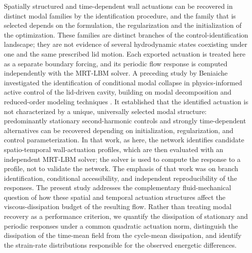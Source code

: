 \documentclass[11pt,a4paper]{article}
\begin{document}
Spatially structured and time-dependent wall actuations can be recovered in
distinct modal families by the identification procedure, and the family that is
selected depends on the formulation, the regularization and the initialization of
the optimization. These families are distinct branches of the
control-identification landscape; they are not evidence of several hydrodynamic
states coexisting under one and the same prescribed lid motion. Each exported
actuation is treated here as a separate boundary forcing, and its
periodic flow response is computed independently with the MRT-LBM solver. A
preceding study by Beniaiche \cite{beniaiche2026} investigated the identification
of conditional modal collapse in
physics-informed active control of the lid-driven cavity, building on modal
decomposition and reduced-order modeling techniques
\cite{schmid2010dmd,taira2017modal,sipp2010global,noack2003hierarchy}. It established that the
identified actuation is not characterized by a unique, universally selected modal
structure: predominantly stationary second-harmonic controls and strongly
time-dependent alternatives can be recovered depending on initialization,
regularization, and control parameterization. In that work, as here, the network
identifies candidate spatio-temporal wall-actuation profiles, which are then
evaluated with an independent MRT-LBM solver; the solver is used to compute the
response to a profile, not to validate the network. The emphasis of that work was on branch identification,
conditional accessibility, and independent reproducibility of the responses. The present
study addresses the complementary fluid-mechanical question of how these spatial
and temporal actuation structures affect the viscous-dissipation budget of the
resulting flow. Rather than treating modal recovery as a performance criterion, we
quantify the dissipation of stationary and periodic responses under a common
quadratic actuation norm, distinguish the dissipation of the time-mean field from
the cycle-mean dissipation, and identify the strain-rate distributions responsible
for the observed energetic differences.
\end{document}
